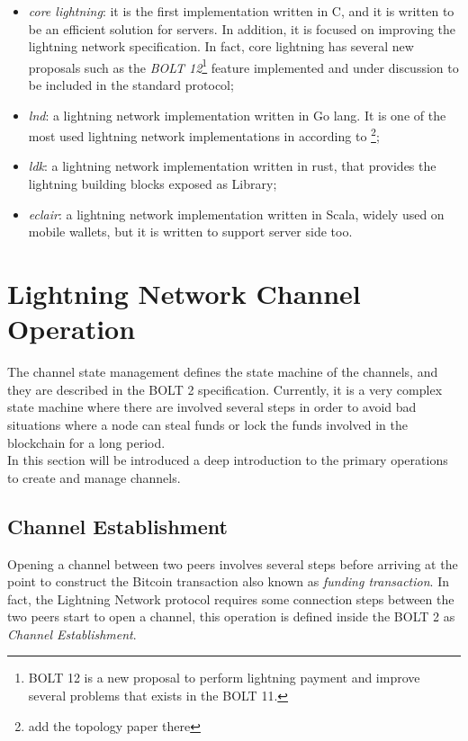 \begin{itemize}
  \item \emph{core lightning}: it is the first implementation written in C, and it is written
        to be an efficient solution for servers. In addition, it is focused on improving the lightning network specification. In fact, core lightning has several new proposals such as the \emph{BOLT 12}\footnote{BOLT 12 is a new proposal to perform
        lightning payment and improve several problems that exists in the BOLT 11.} feature implemented and under discussion to be
        included in the standard protocol;
  \item \emph{lnd}: a lightning network implementation written in Go lang. It is one of the most used lightning network implementations in according to \footnote{add the topology paper there};
  \item \emph{ldk}: a lightning network implementation written in rust, that provides the lightning building blocks exposed as Library;
  \item \emph{eclair}: a lightning network implementation written in Scala, widely used on mobile wallets, but it is written to
        support server side too.
\end{itemize}

\section{Lightning Network Channel Operation}
\label{sec:channel_state}

The channel state management defines the state machine of the channels, and they are described in the BOLT 2 specification. Currently, it is a very complex
state machine where there are involved several steps in order to avoid bad
situations where a node can steal funds or lock the funds involved in the blockchain for a long period.\\
In this section will be introduced a deep introduction to the primary operations to create and manage channels.

\subsection{Channel Establishment}
\label{sec:open_a_channels}

Opening a channel between two peers involves several steps before arriving at the point to construct the Bitcoin transaction also
known as \emph{funding transaction}.
In fact, the Lightning Network protocol requires some connection steps between the two peers start to open a channel, this
operation is defined inside the BOLT 2\cite{bolt2} as \emph{Channel Establishment}.

